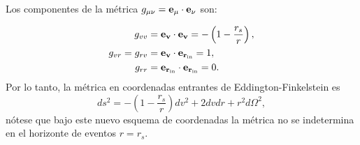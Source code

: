 Los componentes de la métrica \( g_{\mu\nu} = \mathbf{e_\mu} \cdot \mathbf{e_\nu} \) son:

\begin{equation}
    \begin{aligned}
        g_{vv}          & = \mathbf{e_v} \cdot \mathbf{e_v} = -\left(1 - \frac{r_s}{r}\right), \\
        g_{vr} = g_{rv} & = \mathbf{e_v} \cdot \mathbf{e_{r_{\text{in}}}} = 1,                 \\
        g_{rr}          & = \mathbf{e_{r_{\text{in}}}} \cdot \mathbf{e_{r_{\text{in}}}} = 0.
    \end{aligned}
\end{equation}
Por lo tanto, la métrica en coordenadas entrantes de Eddington-Finkelstein es 
\begin{equation}
    ds^2 = -\left(1 - \frac{r_s}{r}\right) dv^2 + 2 dv dr + r^2 d\Omega^2,
\end{equation}
nótese que bajo este nuevo esquema de coordenadas la métrica no se indetermina en el horizonte de eventos \( r = r_s \).  

